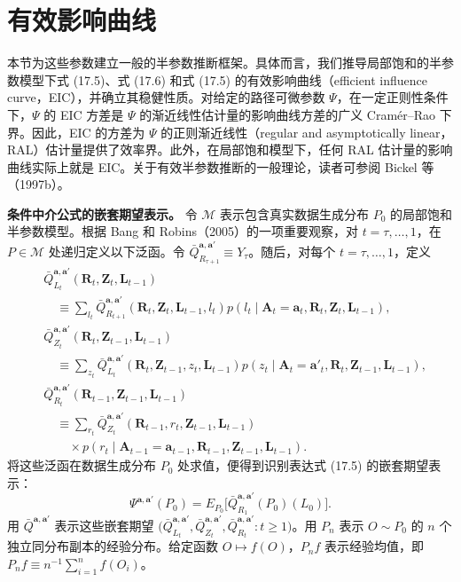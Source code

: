 \section{有效影响曲线}

本节为这些参数建立一般的半参数推断框架。具体而言，我们推导局部饱和的半参数模型下式 (17.5)、式 (17.6) 和式 (17.5) 的有效影响曲线（efficient influence curve，EIC），并确立其稳健性质。对给定的路径可微参数 $\Psi$，在一定正则性条件下，$\Psi$ 的 EIC 方差是 $\Psi$ 的渐近线性估计量的影响曲线方差的广义 Cramér--Rao 下界。因此，EIC 的方差为 $\Psi$ 的正则渐近线性（regular and asymptotically linear，RAL）估计量提供了效率界。此外，在局部饱和模型下，任何 RAL 估计量的影响曲线实际上就是 EIC。关于有效半参数推断的一般理论，读者可参阅 Bickel 等（1997b）。

\noindent\textbf{条件中介公式的嵌套期望表示。}
令 $\mathcal M$ 表示包含真实数据生成分布 $P_0$ 的局部饱和半参数模型。根据 Bang 和 Robins（2005）的一项重要观察，对 $t=\tau,\ldots,1$，在 $P\in\mathcal M$ 处递归定义以下泛函。令 $\bar Q_{R_{\tau+1}}^{\mathbf a,\mathbf a'}\equiv Y_\tau$。随后，对每个 $t=\tau,\ldots,1$，定义
\begin{equation}
\begin{aligned}
 &\bar Q_{L_t}^{\mathbf a,\mathbf a'}(\mathbf R_t,\mathbf Z_t,\mathbf L_{t-1})\\
 &\quad\equiv\sum_{l_t}\bar Q_{R_{t+1}}^{\mathbf a,\mathbf a'}(\mathbf R_t,\mathbf Z_t,\mathbf L_{t-1},l_t)
 p(l_t\mid\mathbf A_t=\mathbf a_t,\mathbf R_t,\mathbf Z_t,\mathbf L_{t-1}),\\
 &\bar Q_{Z_t}^{\mathbf a,\mathbf a'}(\mathbf R_t,\mathbf Z_{t-1},\mathbf L_{t-1})\\
 &\quad\equiv\sum_{z_t}\bar Q_{L_t}^{\mathbf a,\mathbf a'}(\mathbf R_t,\mathbf Z_{t-1},z_t,\mathbf L_{t-1})
 p(z_t\mid\mathbf A_t=\mathbf a'_t,\mathbf R_t,\mathbf Z_{t-1},\mathbf L_{t-1}),\\
 &\bar Q_{R_t}^{\mathbf a,\mathbf a'}(\mathbf R_{t-1},\mathbf Z_{t-1},\mathbf L_{t-1})\\
 &\quad\equiv\sum_{r_t}\bar Q_{Z_t}^{\mathbf a,\mathbf a'}(\mathbf R_{t-1},r_t,\mathbf Z_{t-1},\mathbf L_{t-1})\\
 &\qquad{}\times p(r_t\mid\mathbf A_{t-1}=\mathbf a_{t-1},\mathbf R_{t-1},\mathbf Z_{t-1},\mathbf L_{t-1}).
\end{aligned}
\tag{17.7}
\end{equation}
将这些泛函在数据生成分布 $P_0$ 处求值，便得到识别表达式 (17.5) 的嵌套期望表示：
\begin{equation}
 \Psi^{\mathbf a,\mathbf a'}(P_0)=E_{P_0}\bigl[\bar Q_{R_1}^{\mathbf a,\mathbf a'}(P_0)(L_0)\bigr].
 \tag{17.8}
\end{equation}
用 $\bar Q^{\mathbf a,\mathbf a'}$ 表示这些嵌套期望 $\bigl(\bar Q_{L_t}^{\mathbf a,\mathbf a'},\bar Q_{Z_t}^{\mathbf a,\mathbf a'},\bar Q_{R_t}^{\mathbf a,\mathbf a'}:t\geq1\bigr)$。用 $P_n$ 表示 $O\sim P_0$ 的 $n$ 个独立同分布副本的经验分布。给定函数 $O\mapsto f(O)$，$P_nf$ 表示经验均值，即 $P_nf\equiv n^{-1}\sum_{i=1}^nf(O_i)$。

